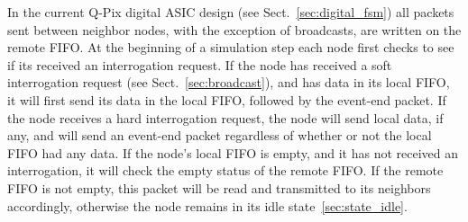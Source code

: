 In the current Q-Pix digital ASIC design (see Sect.~\ref{sec:digital_fsm}) all packets sent between neighbor nodes, with the exception of broadcasts, are written on the remote FIFO.
At the beginning of a simulation step each node first checks to see if its received an interrogation request.
If the node has received a soft interrogation request (see Sect.~\ref{sec:broadcast}), and has data in its local FIFO, it will first send its data in the local FIFO, followed by the event-end packet.
If the node receives a hard interrogation request, the node will send local data, if any, and will send an event-end packet regardless of whether or not the local FIFO had any data.
If the node's local FIFO is empty, and it has not received an interrogation, it will check the empty status of the remote FIFO.
If the remote FIFO is not empty, this packet will be read and transmitted to its neighbors accordingly, otherwise the node remains in its idle state~\ref{sec:state_idle}.

